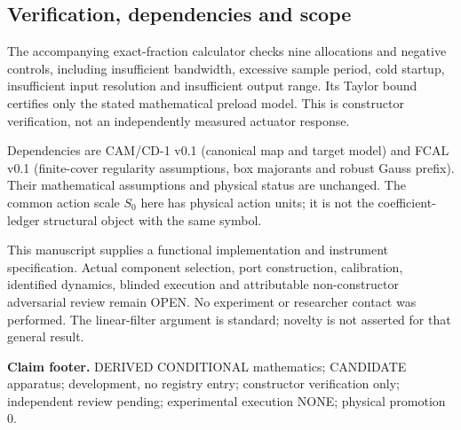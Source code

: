 \documentclass[10pt,a4paper]{article}
\begin{document}
\subsection*{Verification, dependencies and scope}
The accompanying exact-fraction calculator checks nine allocations and negative controls, including insufficient bandwidth, excessive sample period, cold startup, insufficient input resolution and insufficient output range. Its Taylor bound certifies only the stated mathematical preload model. This is constructor verification, not an independently measured actuator response.

Dependencies are CAM/CD-1 v0.1 (canonical map and target model) and FCAL v0.1 (finite-cover regularity assumptions, box majorants and robust Gauss prefix). Their mathematical assumptions and physical status are unchanged. The common action scale $S_0$ here has physical action units; it is not the coefficient-ledger structural object with the same symbol.

This manuscript supplies a functional implementation and instrument specification. Actual component selection, port construction, calibration, identified dynamics, blinded execution and attributable non-constructor adversarial review remain OPEN. No experiment or researcher contact was performed. The linear-filter argument is standard; novelty is not asserted for that general result.

\vfill\noindent\textbf{Claim footer.} DERIVED CONDITIONAL mathematics; CANDIDATE apparatus; development, no registry entry; constructor verification only; independent review pending; experimental execution NONE; physical promotion 0.
\end{document}
